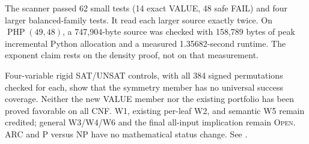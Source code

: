 The scanner passed 62 small tests (14 exact VALUE, 48 safe FAIL) and four
larger balanced-family tests. It read each larger source exactly twice. On
$\operatorname{PHP}(49,48)$, a 747,904-byte source was checked with 158,789 bytes
of peak incremental Python allocation and a measured 1.35682-second runtime.
The exponent claim rests on the density proof, not on that measurement.

Four-variable rigid SAT/UNSAT controls, with all 384 signed permutations
checked for each, show that the symmetry member has no universal success
coverage. Neither the new VALUE member nor the existing portfolio has been
proved favorable on all CNF. W1, existing per-leaf W2, and semantic W5 remain
credited; general W3/W4/W6 and the final all-input implication remain
\textsc{Open}. ARC and P versus NP have no mathematical status change.
See .
